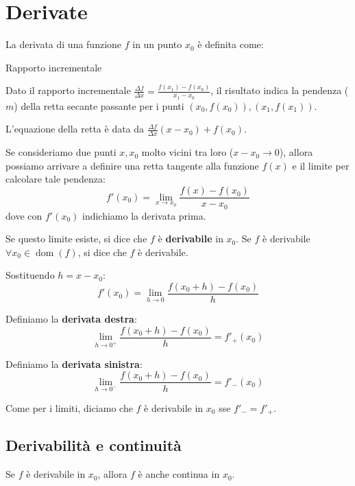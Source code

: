 \documentclass[12pt]{report}
\begin{document}
	\chapter{Derivate}
	
	La derivata di una funzione $f$ in un punto $x_0$ è definita come:
	
	\begin{definizione}{Rapporto incrementale}{}
		
		Dato il rapporto incrementale $\frac{\Delta f}{\Delta x} = \frac{f(x_1) - f(x_0)}{x_1 - x_0}$, il risultato indica la pendenza ($m$) della retta secante passante per i punti $(x_0, f(x_0)), (x_1, f(x_1))$.
		
	\end{definizione}
	
	L'equazione della retta è data da $\frac{\Delta f}{\Delta x} (x - x_0) + f(x_0)$.
	
	Se consideriamo due punti $x, x_0$ molto vicini tra loro ($x - x_0 \to 0$), allora possiamo arrivare a definire una retta tangente alla funzione $f(x)$ e il limite per calcolare tale pendenza:
	\[
	f'(x_0) = \lim_{x \to x_0} \frac{f(x) - f(x_0)}{x - x_0}
	\]
	dove con $f'(x_0)$ indichiamo la derivata prima.
	
	Se questo limite esiste, si dice che $f$ è \textbf{derivabile} in $x_0$.
	Se $f$ è derivabile $\forall x_0 \in \operatorname{dom}(f)$, si dice che $f$ è derivabile.
	
	Sostituendo $h = x - x_0$:
	\[
	f'(x_0) = \lim_{h \to 0} \frac{f(x_0 + h) - f(x_0)}{h}
	\]
	
	Definiamo la \textbf{derivata destra}:
	\[
	\lim_{h \to 0^+} \frac{f(x_0 + h) - f(x_0)}{h} = f'_+(x_0)
	\]
	
	Definiamo la \textbf{derivata sinistra}:
	\[
	\lim_{h \to 0^-} \frac{f(x_0 + h) - f(x_0)}{h} = f'_-(x_0)
	\]
	
	Come per i limiti, diciamo che $f$ è derivabile in $x_0$ sse $f'_- = f'_+$.
	
	\newpage
	\section{Derivabilità e continuità}
	
	\begin{proposizione}{}{}
		
		Se $f$ è derivabile in $x_0$, allora $f$ è anche continua in $x_0$.
		
	\end{proposizione}
	
\end{document}
